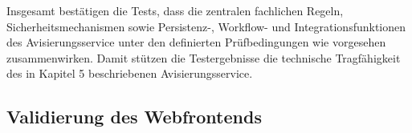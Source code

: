 \documentclass[
  12pt,
  a4paper,
  oneside
]{article}
\newcommand{\contentplaceholder}{\mbox{}\par}
\begin{document}
Insgesamt bestätigen die Tests, dass die zentralen fachlichen Regeln,
Sicherheitsmechanismen sowie Persistenz-, Workflow- und Integrationsfunktionen
des Avisierungsservice unter den definierten Prüfbedingungen wie vorgesehen
zusammenwirken. Damit stützen die Testergebnisse die technische Tragfähigkeit
des in Kapitel 5 beschriebenen Avisierungsservice.

\subsection{Validierung des Webfrontends}
\label{sec:validierung-frontend}

\contentplaceholder
\end{document}
